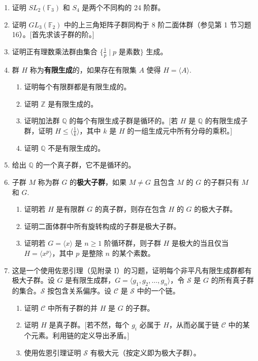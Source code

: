 \begin{enumerate}[label=\arabic*]
\item 证明 \(SL_2(\mathbb{F}_3)\) 和 \(S_4\) 是两个不同构的 24 阶群。

\item 证明 \(GL_3(\mathbb{F}_2)\) 中的上三角矩阵子群同构于 8 阶二面体群（参见第 1 节习题 16）。[首先求该子群的阶。]

\item 证明正有理数乘法群由集合 \(\{\frac{1}{p} \mid p \text{ 是素数}\}\) 生成。

\item 群 \(H\) 称为\textbf{有限生成}的，如果存在有限集 \(A\) 使得 \(H = \langle A \rangle\).
\begin{enumerate}[label=(\alph*)]
\item 证明每个有限群都是有限生成的。
\item 证明 \(\mathbb{Z}\) 是有限生成的。
\item 证明加法群 \(\mathbb{Q}\) 的每个有限生成子群是循环的。[若 \(H\) 是 \(\mathbb{Q}\) 的有限生成子群，证明 \(H \leq \langle \frac{1}{k} \rangle\)，其中 \(k\) 是 \(H\) 的一组生成元中所有分母的乘积。]
\item 证明 \(\mathbb{Q}\) 不是有限生成的。
\end{enumerate}

\item 给出 \(\mathbb{Q}\) 的一个真子群，它不是循环的。

\item 子群 \(M\) 称为群 \(G\) 的\textbf{极大子群}，如果 \(M \neq G\) 且包含 \(M\) 的 \(G\) 的子群只有 \(M\) 和 \(G\).
\begin{enumerate}[label=(\alph*)]
\item 证明若 \(H\) 是有限群 \(G\) 的真子群，则存在包含 \(H\) 的 \(G\) 的极大子群。
\item 证明二面体群中所有旋转构成的子群是极大子群。
\item 证明若 \(G = \langle x \rangle\) 是 \(n \geq 1\) 阶循环群，则子群 \(H\) 是极大的当且仅当 \(H = \langle x^p \rangle\)，其中 \(p\) 是整除 \(n\) 的某个素数。
\end{enumerate}

\item 这是一个使用佐恩引理（见附录 I）的习题，证明每个非平凡有限生成群都有极大子群。设 \(G\) 是有限生成群，\(G = \langle g_1, g_2, \ldots, g_n \rangle\)，令 \(\mathcal{S}\) 是 \(G\) 的所有真子群的集合。\(\mathcal{S}\) 按包含关系偏序。设 \(\mathcal{C}\) 是 \(\mathcal{S}\) 中的一个链。
\begin{enumerate}[label=(\alph*)]
\item 证明 \(\mathcal{C}\) 中所有子群的并 \(H\) 是 \(G\) 的子群。
\item 证明 \(H\) 是真子群。[若不然，每个 \(g_i\) 必属于 \(H\)，从而必属于链 \(\mathcal{C}\) 中的某个元素。利用链的定义导出矛盾。]
\item 使用佐恩引理证明 \(\mathcal{S}\) 有极大元（按定义即为极大子群）。
\end{enumerate}


\end{enumerate}
